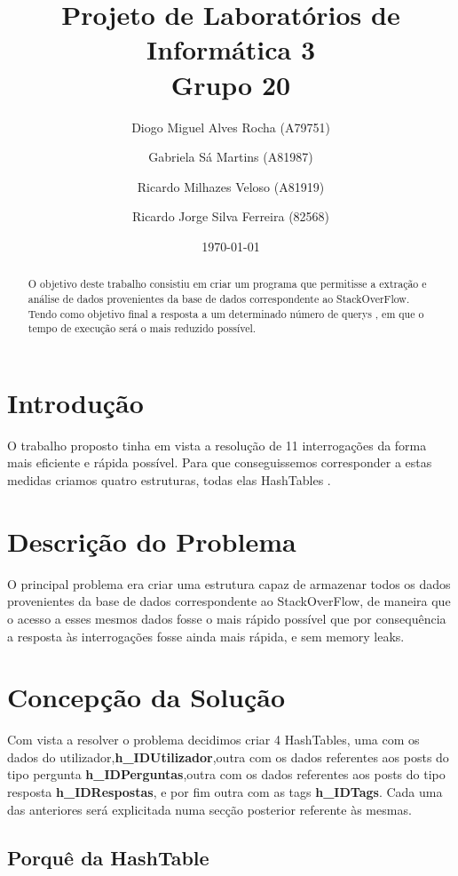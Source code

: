 \documentclass[a4paper]{article}
\title{Projeto de Laboratórios de Informática 3\\Grupo 20}
\author{Diogo Miguel Alves Rocha (A79751) \and Gabriela Sá Martins (A81987) \and Ricardo Milhazes Veloso (A81919) \and Ricardo Jorge Silva Ferreira (82568)}
\date{\today}
\begin{document}
\maketitle

\begin{abstract}

O objetivo deste trabalho consistiu em criar um programa que permitisse a extração e análise de dados provenientes da base de dados correspondente ao StackOverFlow. Tendo como objetivo final a resposta a um determinado número de querys , em que o tempo de execução será o mais reduzido possível.

\end{abstract}

\tableofcontents

\section{Introdução}
\label{sec:intro}
O trabalho proposto tinha em vista a resolução de 11 interrogações da forma mais eficiente e rápida possível. Para que conseguissemos corresponder a estas medidas criamos quatro estruturas, todas elas HashTables .


\section{Descrição do Problema}

O principal problema era criar uma estrutura capaz de armazenar todos os dados provenientes da base de dados correspondente ao StackOverFlow, de maneira que o acesso a esses mesmos dados fosse o mais rápido possível que por consequência a resposta às interrogações fosse ainda mais rápida, e sem memory leaks.

\section{Concepção da Solução}

Com vista a resolver o problema decidimos criar 4 HashTables, uma com os dados do utilizador,\textbf{h_IDUtilizador},outra com os dados referentes aos posts do tipo pergunta \textbf{h_IDPerguntas},outra com os dados referentes aos posts do tipo resposta \textbf{h_IDRespostas}, e por fim outra com as tags \textbf{h_IDTags}. Cada uma das anteriores será explicitada numa secção posterior referente às mesmas. 

	\subsection{Porquê da HashTable}
\end{document}

